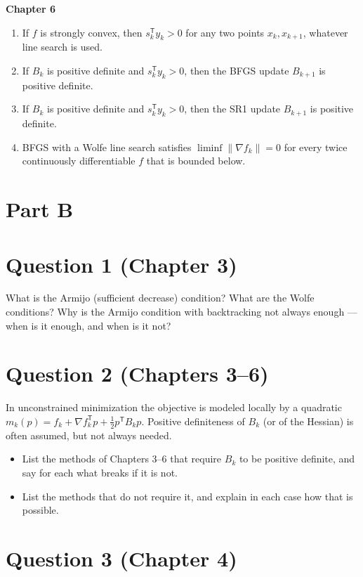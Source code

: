 \documentclass[11pt,a4paper]{article}
\newcommand{\T}{^{\mathsf T}}
\newcommand{\gradf}{\nabla f}
\begin{document}
\textbf{Chapter 6}
\begin{enumerate}[resume]
\item If $f$ is strongly convex, then $s_{k}\T y_{k}>0$ for any two points $x_{k},x_{k+1}$, whatever line search is used.

\item If $B_{k}$ is positive definite and $s_{k}\T y_{k}>0$, then the BFGS update $B_{k+1}$ is positive definite.

\item If $B_{k}$ is positive definite and $s_{k}\T y_{k}>0$, then the SR1 update $B_{k+1}$ is positive definite.

\item BFGS with a Wolfe line search satisfies $\liminf\|\gradf_{k}\|=0$ for every twice continuously differentiable $f$ that is bounded below.
\end{enumerate}

\section*{Part B}

\section*{Question 1 (Chapter 3)}

What is the Armijo (sufficient decrease) condition? What are the Wolfe conditions?
Why is the Armijo condition with backtracking not always enough --- when is it enough, and when is it not?


\section*{Question 2 (Chapters 3--6)}

In unconstrained minimization the objective is modeled locally by a quadratic $m_{k}(p)=f_{k}+\gradf_{k}\T p+\tfrac12p\T B_{k}p$. Positive definiteness of $B_{k}$ (or of the Hessian) is often assumed, but not always needed.
\begin{itemize}
\item[(A)] List the methods of Chapters 3--6 that require $B_{k}$ to be positive definite, and say for each what breaks if it is not.
\item[(B)] List the methods that do not require it, and explain in each case how that is possible.
\end{itemize}


\section*{Question 3 (Chapter 4)}
\end{document}
